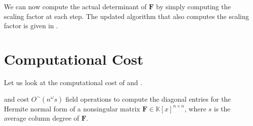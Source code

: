 We can now compute the actual determinant of $\mathbf{F}$ by simply
computing the scaling factor at each step. The updated algorithm that
also computes the scaling factor is given in .






\section{Computational Cost}

Let us look at the computational cost of 
and . 
\begin{thm}
 and 
cost $O^{\sim}\left(n^{\omega}s\right)$ field operations to compute
the diagonal entries for the Hermite normal form of a nonsingular
matrix $\mathbf{F}\in\mathbb{K}\left[x\right]^{n\times n}$, where
$s$ is the average column degree of $\mathbf{F}$. \end{thm}
